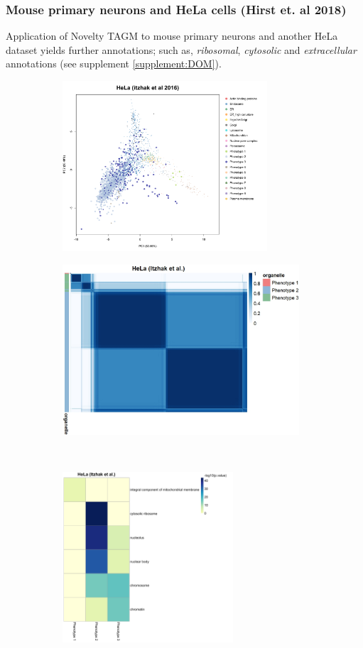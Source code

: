 \documentclass[12pt,english]{article}
\begin{document}
\subsubsection{Mouse primary neurons and HeLa cells (Hirst et. al 2018)}
Application of Novelty TAGM to mouse primary neurons \citep{Itzhak::2017} and another HeLa dataset \citep{Hirst:2018} yields further annotations; such as, \textit{ribosomal}, \textit{cytosolic} and \textit{extracellular} annotations (see supplement \ref{supplement:DOM}). 
\begin{figure}
	\begin{subfigure}[t]{0.5\textwidth}
		\centering
		\includegraphics[height=2.5in]{pcaItzhak2016.pdf}
		\caption{}
	\end{subfigure}
	\begin{subfigure}[t]{0.5\textwidth}
		\centering
		\includegraphics[height=2.5in]{itzhak2016heatmap.jpeg}
		\caption{}
	\end{subfigure}
~
	\begin{subfigure}[t]{\textwidth}
	\centering
	\includegraphics[height=2.5in]{pvalueItzhak}

\end{subfigure}
\end{figure}
\end{document}
